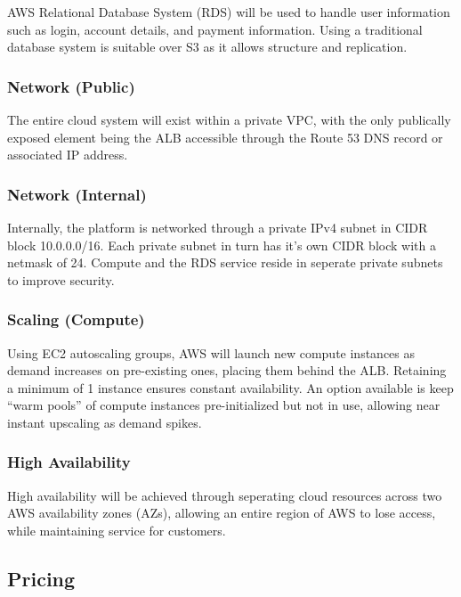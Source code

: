 AWS Relational Database System (RDS) will be used to handle user information such as login, account details, and payment information. Using a traditional database system is suitable over S3 as it allows structure and replication.

\subsubsection*{Network (Public)}

The entire cloud system will exist within a private VPC, with the only publically exposed element being the ALB accessible through the Route 53 DNS record or associated IP address.

\subsubsection*{Network (Internal)}

Internally, the platform is networked through a private IPv4 subnet in CIDR block 10.0.0.0/16. Each private subnet in turn has it's own CIDR block with a netmask of 24. Compute and the RDS service reside in seperate private subnets to improve security.

\subsubsection*{Scaling (Compute)}

Using EC2 autoscaling groups, AWS will launch new compute instances as demand increases on pre-existing ones, placing them behind the ALB. Retaining a minimum of 1 instance ensures constant availability. An option available is keep ``warm pools'' of compute instances pre-initialized but not in use, allowing near instant upscaling as demand spikes.

\subsubsection*{High Availability}

High availability will be achieved through seperating cloud resources across two AWS availability zones (AZs), allowing an entire region of AWS to lose access, while maintaining service for customers.

\subsection{Pricing}

